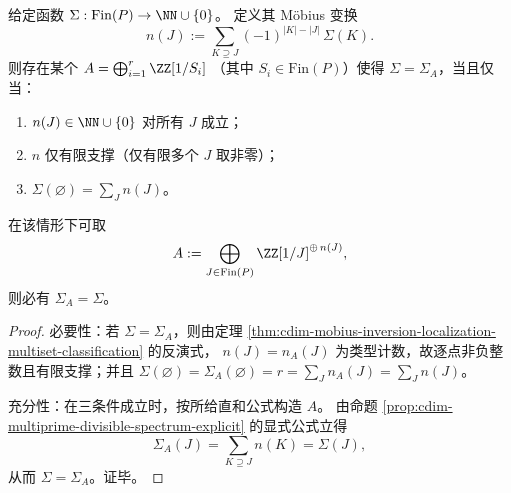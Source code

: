 \begin{theorem}\label{thm:cdim-multiprime-spectrum-realizability}
给定函数 \(\Sigma:\mathrm{Fin}(P)\to\NN\cup\{0\}\)。
定义其 Möbius 变换
\[
n(J):=\sum_{K\supseteq J}(-1)^{|K|-|J|}\,\Sigma(K).
\]
则存在某个
\(
A=\bigoplus_{i=1}^{r}\ZZ[1/S_i]
\)
（其中 \(S_i\in\mathrm{Fin}(P)\)）使得 \(\Sigma=\Sigma_A\)，当且仅当：
\begin{enumerate}
  \item \(n(J)\in\NN\cup\{0\}\) 对所有 \(J\) 成立；
  \item \(n\) 仅有限支撑（仅有限多个 \(J\) 取非零）；
  \item \(\Sigma(\varnothing)=\sum_{J}n(J)\)。
\end{enumerate}
在该情形下可取
\[
A:=\bigoplus_{J\in\mathrm{Fin}(P)}\ZZ[1/J]^{\oplus\,n(J)},
\]
则必有 \(\Sigma_A=\Sigma\)。
\end{theorem}

\begin{proof}
必要性：若 \(\Sigma=\Sigma_A\)，则由定理 \ref{thm:cdim-mobius-inversion-localization-multiset-classification} 的反演式，
\(n(J)=n_A(J)\) 为类型计数，故逐点非负整数且有限支撑；并且
\(\Sigma(\varnothing)=\Sigma_A(\varnothing)=r=\sum_J n_A(J)=\sum_J n(J)\)。
\par
充分性：在三条件成立时，按所给直和公式构造 \(A\)。
由命题 \ref{prop:cdim-multiprime-divisible-spectrum-explicit} 的显式公式立得
\[
\Sigma_A(J)=\sum_{K\supseteq J}n(K)=\Sigma(J),
\]
从而 \(\Sigma=\Sigma_A\)。证毕。
\end{proof}

\endinput
